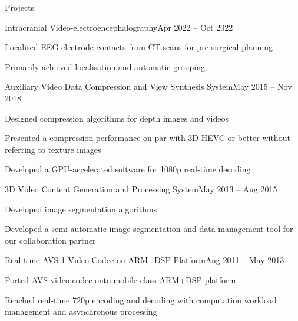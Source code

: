 \documentclass{resume} %
\begin{document}

\begin{rSection}{Projects}

	\begin{rSubsection}{Intracranial Video-electroencephalography}{Apr 2022 -- Oct 2022}{}{}
		\item Localised EEG electrode contacts from CT scans for pre-surgical planning
		\item Primarily achieved localisation and automatic grouping
	\end{rSubsection}

	\begin{rSubsection}{Auxiliary Video Data Compression and View Synthesis System}{May 2015 -- Nov 2018}{}{}
		\item Designed compression algorithms for depth images and videos
		\item Presented a compression performance on par with 3D-HEVC or better without referring to texture images
		\item Developed a GPU-accelerated software for 1080p real-time decoding
	\end{rSubsection}
		
	\begin{rSubsection}{3D Video Content Generation and Processing System}{May 2013 -- Aug 2015}{}{}
		\item Developed image segmentation algorithms
		\item Developed a semi-automatic image segmentation and data management tool for our collaboration partner
	\end{rSubsection}
		
	\begin{rSubsection}{Real-time AVS-1 Video Codec on ARM+DSP Platform}{Aug 2011 -- May 2013}{}{}
		\item Ported AVS video codec onto mobile-class ARM+DSP platform
		\item Reached real-time 720p encoding and decoding with computation workload management and asynchronous processing
	\end{rSubsection}

\end{rSection}

\end{document}
